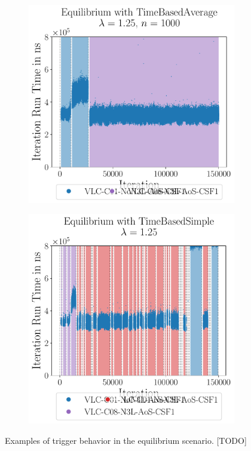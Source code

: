 \begin{figure}[htpb]
	\begin{subfigure}{0.5\textwidth}
		\centering
		\includegraphics[width=\textwidth]{./Figures/plots/equilibrium_configs_good.pdf}
	\end{subfigure}
	\begin{subfigure}{0.5\textwidth}
		\centering
		\includegraphics[width=\textwidth]{./Figures/plots/equilibrium_configs_bad.pdf}
	\end{subfigure}
	\caption{Examples of trigger behavior in the equilibrium scenario. [TODO]}
	\label{fig:equilibrium_trigger_behavior}
\end{figure}

